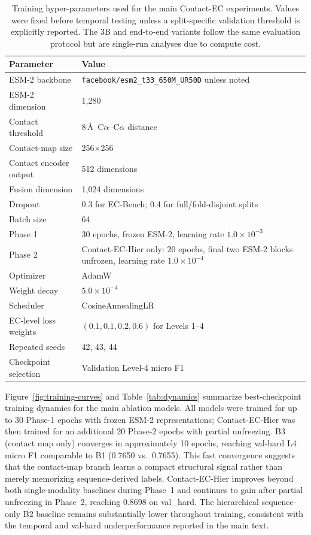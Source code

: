 \documentclass[11pt,a4paper]{article}
\begin{document}
\begin{table}[htbp]
\centering
\caption{Training hyper-parameters used for the main Contact-EC experiments.
Values were fixed before temporal testing unless a split-specific validation
threshold is explicitly reported. The 3B and end-to-end variants follow the same
evaluation protocol but are single-run analyses due to compute cost.}
\label{tab:training_hyperparams}
\small
\setlength{\tabcolsep}{4pt}
\begin{tabular}{ll}
\toprule
Parameter & Value \\
\midrule
ESM-2 backbone & \texttt{facebook/esm2\_t33\_650M\_UR50D} unless noted \\
ESM-2 dimension & 1{,}280 \\
Contact threshold & 8\,\AA\ C$\alpha$--C$\alpha$ distance \\
Contact-map size & 256$\times$256 \\
Contact encoder output & 512 dimensions \\
Fusion dimension & 1{,}024 dimensions \\
Dropout & 0.3 for EC-Bench; 0.4 for full/fold-disjoint splits \\
Batch size & 64 \\
Phase 1 & 30 epochs, frozen ESM-2, learning rate $1.0\times10^{-3}$ \\
Phase 2 & Contact-EC-Hier only: 20 epochs, final two ESM-2 blocks unfrozen, learning rate $1.0\times10^{-4}$ \\
Optimizer & AdamW \\
Weight decay & $5.0\times10^{-4}$ \\
Scheduler & CosineAnnealingLR \\
EC-level loss weights & $(0.1, 0.1, 0.2, 0.6)$ for Levels 1--4 \\
Repeated seeds & 42, 43, 44 \\
Checkpoint selection & Validation Level-4 micro F1 \\
\bottomrule
\end{tabular}
\end{table}

Figure~\ref{fig:training-curves} and Table~\ref{tab:dynamics} summarize
best-checkpoint training dynamics for the main ablation models. All models were
trained for up to 30 Phase-1 epochs with frozen ESM-2 representations;
Contact-EC-Hier was then trained for an additional 20 Phase-2 epochs with partial
unfreezing. B3 (contact map only) converges in approximately 10 epochs, reaching
val-hard L4 micro F1 comparable to B1 (0.7650 vs.\ 0.7655). This fast convergence
suggests that the contact-map branch learns a compact structural signal rather
than merely memorizing sequence-derived labels. Contact-EC-Hier improves beyond
both single-modality baselines during Phase~1 and continues to gain after
partial unfreezing in Phase~2, reaching 0.8698 on val\_hard. The hierarchical
sequence-only B2 baseline remains substantially lower throughout training,
consistent with the temporal and val-hard underperformance reported in the main
text.
\end{document}
